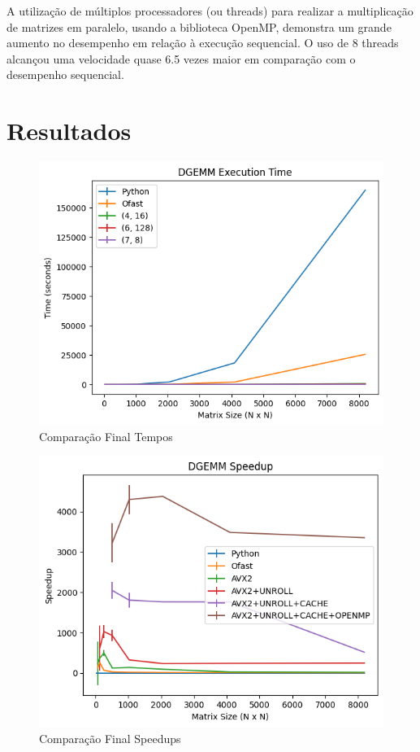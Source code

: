 \documentclass[12pt]{article}
\begin{document}
A utilização de múltiplos processadores (ou threads) para realizar a multiplicação de matrizes em paralelo, usando a biblioteca OpenMP, demonstra um grande aumento no desempenho em relação à execução sequencial. O uso de 8 threads alcançou uma velocidade quase 6.5 vezes maior em comparação com o desempenho sequencial.

\section{Resultados}

\begin{figure}[h]
    \centering
    \includegraphics[scale=0.75]{figures/all_times_sizes.png}
    \caption{Comparação Final Tempos}
    \label{fig:times-finall}
\end{figure}

\begin{figure}[h]
    \centering
    \includegraphics[scale=0.75]{figures/all_speedups_sizes.png}
    \caption{Comparação Final Speedups}
    \label{fig:speedups-final}
\end{figure}
\end{document}
